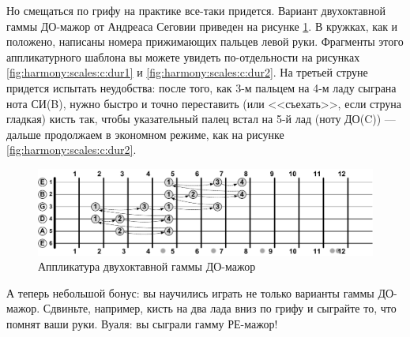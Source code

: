 Но смещаться по грифу на практике все-таки придется. Вариант двухоктавной гаммы ДО-мажор от Андреаса Сеговии приведен на рисунке \ref{fig:harmony:scales:c:dur:segovia}. В кружках, как и положено, написаны номера прижимающих пальцев левой руки. Фрагменты этого аппликатурного шаблона вы можете увидеть по-отдельности на рисунках \ref{fig:harmony:scales:c:dur1} и \ref{fig:harmony:scales:c:dur2}. На третьей струне придется испытать неудобства: после того, как 3-м пальцем на 4-м ладу сыграна нота СИ(B), нужно быстро и точно переставить (или <<съехать>>, если струна гладкая) кисть так, чтобы указательный палец встал на 5-й лад (ноту ДО(C)) --- дальше продолжаем в экономном режиме, как на рисунке \ref{fig:harmony:scales:c:dur2}.

\begin{figure}[!ht]
    \centering
    \includegraphics[width=\textwidth]{fig/intervals/c-dur-csale-segovia} 
    \caption{Аппликатура двухоктавной гаммы ДО-мажор}\label{fig:harmony:scales:c:dur:segovia}
\end{figure} 

А теперь небольшой бонус: вы научились играть не только варианты гаммы ДО-мажор. Сдвиньте, например, кисть на два лада вниз по грифу и сыграйте то, что помнят ваши руки. Вуаля: вы сыграли гамму РЕ-мажор!

